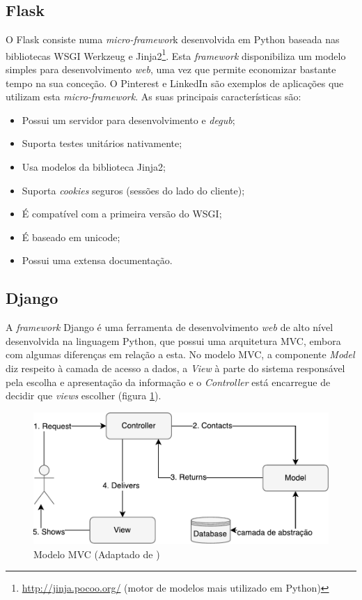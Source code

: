 \subsection{Flask}

O Flask consiste numa \textit{micro-framewor}k desenvolvida em Python baseada nas bibliotecas \ac{WSGI} Werkzeug e Jinja2\footnote{\url{http://jinja.pocoo.org/} (motor de modelos mais utilizado em Python)}. Esta \textit{framework} disponibiliza um  modelo simples para desenvolvimento \textit{web}, uma vez que permite economizar bastante tempo na sua conceção. O Pinterest e LinkedIn são exemplos de aplicações que utilizam esta \textit{micro-framework}. As suas principais características  são\cite{Flask2014}:  

\begin{itemize}
	\item Possui um servidor para desenvolvimento e \textit{degub}; 
	\item Suporta testes unitários nativamente; 
	\item Usa modelos da biblioteca Jinja2; 
	\item Suporta \textit{cookies} seguros (sessões do lado do cliente); 
	\item É compatível com a primeira versão do \ac{WSGI}; 
	\item É baseado em unicode; 
	\item Possui uma extensa documentação.
\end{itemize}

\subsection{Django}
\label{django}

A \textit{framework} Django é uma ferramenta de desenvolvimento \textit{web} de alto nível desenvolvida na linguagem Python, que possui uma arquitetura \ac{MVC}\cite{Deacon2005}, embora com algumas diferenças em relação a esta. No modelo \ac{MVC}, a componente \textit{Model} diz respeito à camada de acesso a dados, a \textit{View} à parte do sistema responsável pela escolha e apresentação da informação e o \textit{Controller} está encarregue de decidir que \textit{views} escolher (figura \ref{mvcdiag}). 

\begin{figure}[!htb]
	\centering
	\includegraphics[scale=0.7]{esquemas/MVC-diagram.pdf}
	\caption[]{Modelo \ac{MVC} (Adaptado de \cite{Sugrue2013})}
	\label{mvcdiag}
\end{figure}

